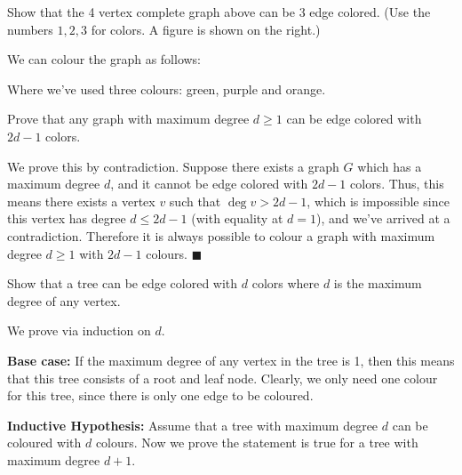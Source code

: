 \documentclass[11pt]{article}
\begin{document}
\begin{Parts}
\Part Show that the 4 vertex complete graph above can be 3 edge colored. (Use the numbers $1,2,3$ for colors. A figure is shown on the right.)

\begin{solution}
    We can colour the graph as follows: 

    \begin{center}
    \end{center}

    Where we've used three colours: green, purple and orange.
\end{solution}

\Part Prove that any graph with maximum degree $d \geq 1$ can be edge colored with $2d-1$ colors. 

\begin{solution}
    We prove this by contradiction. Suppose there exists a graph $G$ which has a maximum degree $d$, and it cannot be edge colored with $2d - 1$ colors. Thus, this means there exists a vertex $v$ such that $\deg v > 2d-1$, which is impossible since this vertex has degree $d \le 2d -1$ (with equality at $d=1$), and we've arrived at a contradiction. Therefore it is always possible to colour a graph with maximum degree $d \ge 1$ with $2d-1$ colours. $\blacksquare$
\end{solution}

\Part Show that a tree can be edge colored with $d$ colors where $d$ is the maximum degree of any vertex.

\begin{solution}
    We prove via induction on $d$.

    \textbf{Base case:} If the maximum degree of any vertex in the tree is 1, then this means that this tree consists of a root and leaf node. Clearly, we only need one colour for this tree, since there is only one edge to be coloured.

    \textbf{Inductive Hypothesis:} Assume that a tree with maximum degree $d$ can be coloured with $d$ colours. Now we prove the statement is true for a tree with maximum degree $d+1$.


\end{solution}
\end{Parts}
\end{document}
